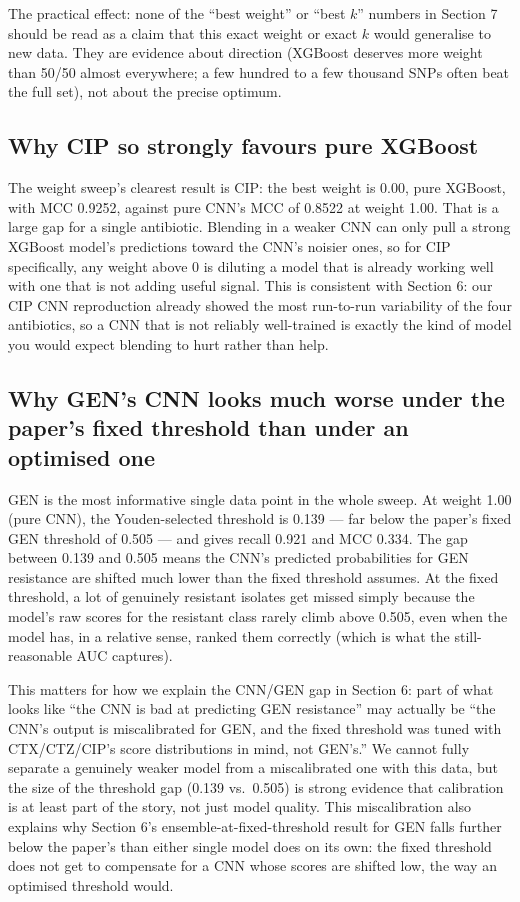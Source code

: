 \documentclass[11pt]{article}
\begin{document}
The practical effect: none of the ``best weight'' or ``best $k$'' numbers in Section 7 should be read as a claim that this exact weight or exact $k$ would generalise to new data. They are evidence about direction (XGBoost deserves more weight than 50/50 almost everywhere; a few hundred to a few thousand SNPs often beat the full set), not about the precise optimum.

\subsection{Why CIP so strongly favours pure XGBoost}

The weight sweep's clearest result is CIP: the best weight is 0.00, pure XGBoost, with MCC 0.9252, against pure CNN's MCC of 0.8522 at weight 1.00. That is a large gap for a single antibiotic. Blending in a weaker CNN can only pull a strong XGBoost model's predictions toward the CNN's noisier ones, so for CIP specifically, any weight above 0 is diluting a model that is already working well with one that is not adding useful signal. This is consistent with Section 6: our CIP CNN reproduction already showed the most run-to-run variability of the four antibiotics, so a CNN that is not reliably well-trained is exactly the kind of model you would expect blending to hurt rather than help.

\subsection{Why GEN's CNN looks much worse under the paper's fixed threshold than under an optimised one}

GEN is the most informative single data point in the whole sweep. At weight 1.00 (pure CNN), the Youden-selected threshold is 0.139 --- far below the paper's fixed GEN threshold of 0.505 --- and gives recall 0.921 and MCC 0.334. The gap between 0.139 and 0.505 means the CNN's predicted probabilities for GEN resistance are shifted much lower than the fixed threshold assumes. At the fixed threshold, a lot of genuinely resistant isolates get missed simply because the model's raw scores for the resistant class rarely climb above 0.505, even when the model has, in a relative sense, ranked them correctly (which is what the still-reasonable AUC captures).

This matters for how we explain the CNN/GEN gap in Section 6: part of what looks like ``the CNN is bad at predicting GEN resistance'' may actually be ``the CNN's output is miscalibrated for GEN, and the fixed threshold was tuned with CTX/CTZ/CIP's score distributions in mind, not GEN's.'' We cannot fully separate a genuinely weaker model from a miscalibrated one with this data, but the size of the threshold gap (0.139 vs.\ 0.505) is strong evidence that calibration is at least part of the story, not just model quality. This miscalibration also explains why Section 6's ensemble-at-fixed-threshold result for GEN falls further below the paper's than either single model does on its own: the fixed threshold does not get to compensate for a CNN whose scores are shifted low, the way an optimised threshold would.
\end{document}
